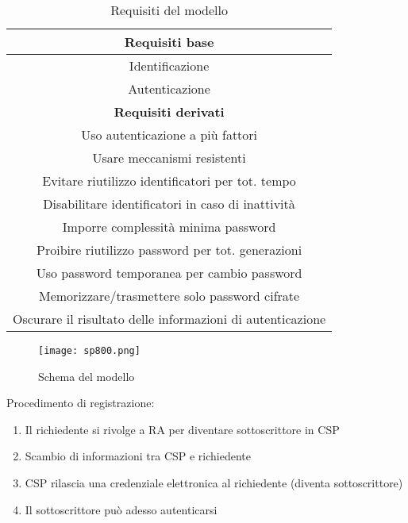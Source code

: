 \documentclass{article}
\begin{document}
\begin{table}[ht]
    \centering
    \begin{tabular}{|c|}
        \hline
        \textbf{Requisiti base}\\
        \hline
        Identificazione\\
        \hline
        Autenticazione\\
        \hline
        \textbf{Requisiti derivati}\\
        \hline
        Uso autenticazione a più fattori\\
        \hline
        Usare meccanismi resistenti\\
        \hline
        Evitare riutilizzo identificatori per tot. tempo\\
        \hline
        Disabilitare identificatori in caso di inattività\\
        \hline
        Imporre complessità minima password\\
        \hline
        Proibire riutilizzo password per tot. generazioni\\
        \hline
        Uso password temporanea per cambio password\\
        \hline
        Memorizzare/trasmettere solo password cifrate\\
        \hline
         Oscurare il risultato delle informazioni di autenticazione\\
         \hline
    \end{tabular}
    \caption{Requisiti del modello}
\end{table}

\newpage

\begin{figure}[ht]
    \centering
    \texttt{[image: sp800.png]}
    \caption{Schema del modello}
\end{figure}

\noindent Procedimento di registrazione:
\begin{enumerate}
    \item Il richiedente si rivolge a RA per diventare sottoscrittore in CSP
    \item Scambio di informazioni tra CSP e richiedente
    \item CSP rilascia una credenziale elettronica al richiedente (diventa sottoscrittore)
    \item Il sottoscrittore può adesso autenticarsi\newline
\end{enumerate}
\end{document}
